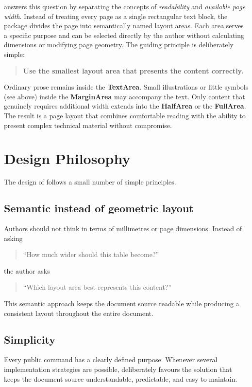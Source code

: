 \documentclass[
11pt,
a4paper,
oneside
]{scrbook}
\begin{document}
\noindent \mdlayout{} answers this question by separating the concepts of
\emph{readability} and \emph{available page width}.
Instead of treating every page as a single rectangular text block, the package
divides the page into semantically named layout areas.
Each area serves a specific purpose and can be selected directly by the author
without calculating dimensions or modifying page geometry.
The guiding principle is deliberately simple:
\begin{quote}
	\textbf{Use the smallest layout area that presents the content correctly.}
\end{quote}
Ordinary prose remains inside the \textbf{TextArea}.
Small illustrations or little symbols (see above) inside the
\textbf{MarginArea} may accompany the text.
Only content that genuinely requires additional width extends into the
\textbf{HalfArea} or the \textbf{FullArea}.
The result is a page layout that combines comfortable reading with the ability
to present complex technical material without compromise.

\section{Design Philosophy}

The design of \mdlayout{} follows a small number of simple principles.

\subsection{Semantic instead of geometric layout}
Authors should not think in terms of millimetres or page dimensions.
Instead of asking
\begin{quote}
	``How much wider should this table become?''
\end{quote}
the author asks
\begin{quote}
	``Which layout area best represents this content?''
\end{quote}
This semantic approach keeps the document source readable while producing a
consistent layout throughout the entire document.

\subsection{Simplicity}

Every public command has a clearly defined purpose.
Whenever several implementation strategies are possible,
\mdlayout{} deliberately favours the solution that keeps the document
source understandable, predictable, and easy to maintain.
\end{document}
